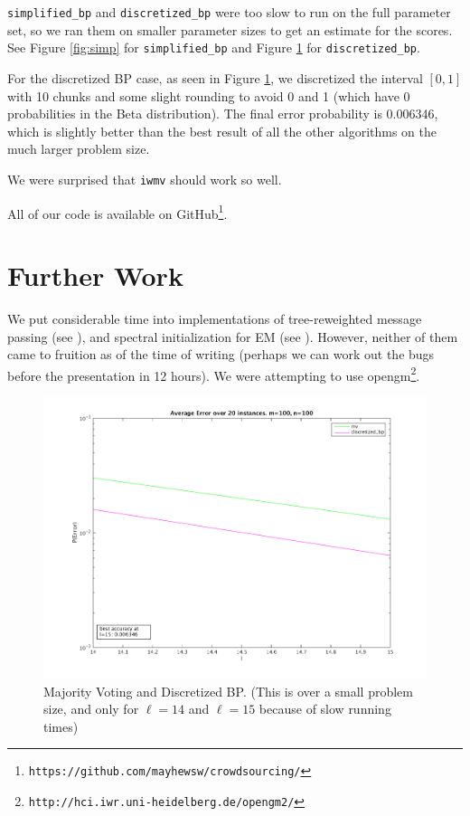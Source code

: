 \documentclass[11pt]{article}
\begin{document}
\texttt{simplified\_bp} and \texttt{discretized\_bp} were too slow to run on the full parameter set, so we ran them on smaller parameter sizes to get an estimate for the scores. See Figure \ref{fig:simp} for \texttt{simplified\_bp} and Figure \ref{fig:disc} for \texttt{discretized\_bp}.

For the discretized BP case, as seen in Figure \ref{fig:disc}, we discretized the interval $[0,1]$ with 10 chunks and some slight rounding to avoid 0 and 1 (which have 0 probabilities in the Beta distribution). The final error probability is 0.006346, which is slightly better than the best result of all the other algorithms on the much larger problem size. 

We were surprised that \texttt{iwmv} should work so well. 

All of our code is available on GitHub\footnote{\texttt{https://github.com/mayhewsw/crowdsourcing/}}.

\section{Further Work}
We put considerable time into implementations of tree-reweighted message passing (see \cite{kolmogorov2006convergent}), and spectral initialization for EM (see \cite{zhang2014spectral}). However, neither of them came to fruition as of the time of writing (perhaps we can work out the bugs before the presentation in 12 hours). We were attempting to use opengm\footnote{\texttt{http://hci.iwr.uni-heidelberg.de/opengm2/}}.




\begin{figure}[t]
\centering
\includegraphics[scale=0.6]{mv_discretized.png}
\caption{Majority Voting and Discretized BP. (This is over a small problem size, and only for $\ell=14$ and $\ell=15$ because of slow running times)}
\label{fig:disc}
\end{figure}
\end{document}
